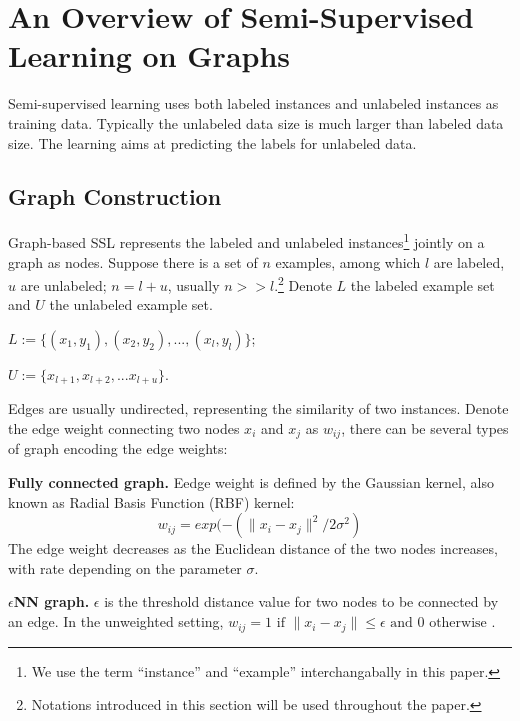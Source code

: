 \section{An Overview of Semi-Supervised Learning on Graphs}

Semi-supervised learning uses both labeled instances and unlabeled instances as
training data. 
Typically the unlabeled data size is much larger than labeled data size. The
learning aims at predicting the labels for unlabeled data.

\subsection{Graph Construction} \label{sec:graphconst}
Graph-based SSL represents the labeled and unlabeled instances\footnote{We use
the term ``instance'' and ``example'' interchangabally in this paper.} jointly on a
graph as nodes. Suppose there is a set of 
$n$ examples, among which $l$ are labeled, $u$ are unlabeled;
$n = l + u$, usually $n >> l$.\footnote{Notations introduced in this section will be used throughout
the paper.}
Denote $L$ the labeled example set and $U$ the unlabeled example set.

$L:= \{(x_1, y_1), (x_2, y_2), ..., (x_l, y_l)\}$;

$U:= \{x_{l+1}, x_{l+2}, ... x_{l+u}\}$.

Edges are usually undirected, representing the similarity of two instances.
Denote the edge weight connecting two nodes $x_i$ and $x_j$ as
$w_{ij}$, there can be several types of graph encoding the edge weights:

\textbf{Fully connected graph.} Eedge weight is defined by the Gaussian
kernel, also known as Radial Basis Function (RBF) kernel: \[ w_{ij} =
exp(- (\|x_i-x_j\|^2/2\sigma ^2) \]
The edge weight decreases as the Euclidean distance of the two nodes
increases, with rate depending on the parameter $\sigma$.

\textbf{$\epsilon$NN graph.} 
$\epsilon$ is the threshold distance value for two nodes to be connected
by an edge. In the unweighted setting, \( w_{ij} = 1 \mbox{ if } \|x_i-x_j\| \leq
\epsilon \mbox{ and } 0 \mbox{ otherwise }\).


